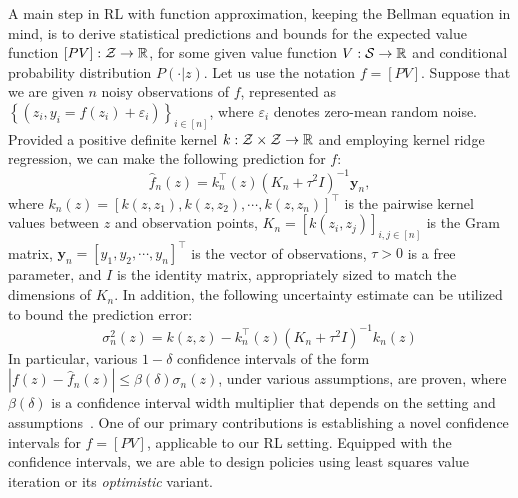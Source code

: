 A main step in RL with function approximation, keeping the Bellman equation in mind, is to derive statistical predictions and bounds for the expected value function
$[PV]:\mathcal{Z}\rightarrow \mathbb{R}$, for some given value function $V:\mathcal{S}\rightarrow \mathbb{R}$ and conditional probability distribution $P(\cdot|z)$. Let us use the notation $f=[PV]$. Suppose that we are given $n$ noisy observations of $f$, represented as $\left\{(z_i, y_i=f(z_i)+\varepsilon_i)\right\}_{i\in[n]}$, where $\varepsilon_i$ denotes zero-mean random noise. Provided a positive definite kernel $k: \mathcal{Z}\times\mathcal{Z}\rightarrow \mathbb{R}$ and employing kernel ridge regression, we can make the following prediction for $f$:
\begin{equation}
    \hat{f}_n(z) = k^{\top}_n(z)(K_n+\tau^2 I)^{-1}\bm{y}_n,
\end{equation}
where $k_n(z)=[k(z,z_1), k(z,z_2), \cdots, k(z,z_n)]^{\top}$ is the pairwise kernel values between $z$ and observation points, $K_n=[k(z_i, z_j)]_{i,j\in[n]}$ is the Gram matrix, $\bm{y}_n=[y_1, y_2, \cdots, y_n]^{\top}$ is the vector of observations, $\tau>0$ is a free parameter, and $I$ is the identity matrix, appropriately sized to match the dimensions of $K_n$. In addition, the following uncertainty estimate can be utilized to bound the prediction error:
\begin{equation}\label{eq:krrvar}
    \sigma_n^2(z)= k(z,z)-k^{\top}_n(z)(K_n+\tau^2 I)^{-1}k_n(z)
\end{equation}
In particular, various $1-\delta$ confidence intervals of the form $|f(z)-\hat{f}_n(z)|\le \beta(\delta) \sigma_n(z)$, under various assumptions, are proven, where $\beta(\delta)$ is a confidence interval width multiplier that depends on the setting and assumptions~\citep{abbasi2013online, chowdhury2017kernelized, vakili2021optimal,  whitehouse2024sublinear}.
One of our primary contributions is establishing a novel confidence intervals for $f=[PV]$, applicable to our RL setting.
Equipped with the confidence intervals, we are able to design policies using least squares value iteration or its \emph{optimistic} variant.


